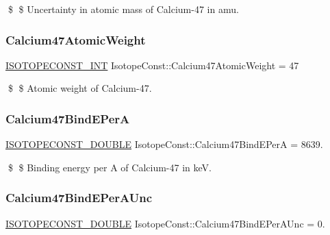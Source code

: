\$ \$ Uncertainty in atomic mass of Calcium-\/47 in amu. \mbox{\label{group___isotope_const-_calcium-_ca47_ga0b4caba027f0f4057c3232f367fc3885}} 
\subsubsection{\texorpdfstring{Calcium47\+Atomic\+Weight}{Calcium47AtomicWeight}}
{\footnotesize\ttfamily \mbox{\hyperlink{group___isotope_const-_macros_ga5f18360b3e99483a35c32d789e62621c}{I\+S\+O\+T\+O\+P\+E\+C\+O\+N\+S\+T\+\_\+\+I\+NT}} Isotope\+Const\+::\+Calcium47\+Atomic\+Weight = 47}

\$ \$ Atomic weight of Calcium-\/47. \mbox{\label{group___isotope_const-_calcium-_ca47_gaf51db520e5efad498c929d4b43e5f735}} 
\subsubsection{\texorpdfstring{Calcium47\+Bind\+E\+PerA}{Calcium47BindEPerA}}
{\footnotesize\ttfamily \mbox{\hyperlink{group___isotope_const-_macros_ga8f45a7272ce02c0b4c65c44636ed719a}{I\+S\+O\+T\+O\+P\+E\+C\+O\+N\+S\+T\+\_\+\+D\+O\+U\+B\+LE}} Isotope\+Const\+::\+Calcium47\+Bind\+E\+PerA = 8639.}

\$ \$ Binding energy per A of Calcium-\/47 in keV. \mbox{\label{group___isotope_const-_calcium-_ca47_ga27eae9b91b71f33bb98e17f043d8da3a}} 
\subsubsection{\texorpdfstring{Calcium47\+Bind\+E\+Per\+A\+Unc}{Calcium47BindEPerAUnc}}
{\footnotesize\ttfamily \mbox{\hyperlink{group___isotope_const-_macros_ga8f45a7272ce02c0b4c65c44636ed719a}{I\+S\+O\+T\+O\+P\+E\+C\+O\+N\+S\+T\+\_\+\+D\+O\+U\+B\+LE}} Isotope\+Const\+::\+Calcium47\+Bind\+E\+Per\+A\+Unc = 0.}

